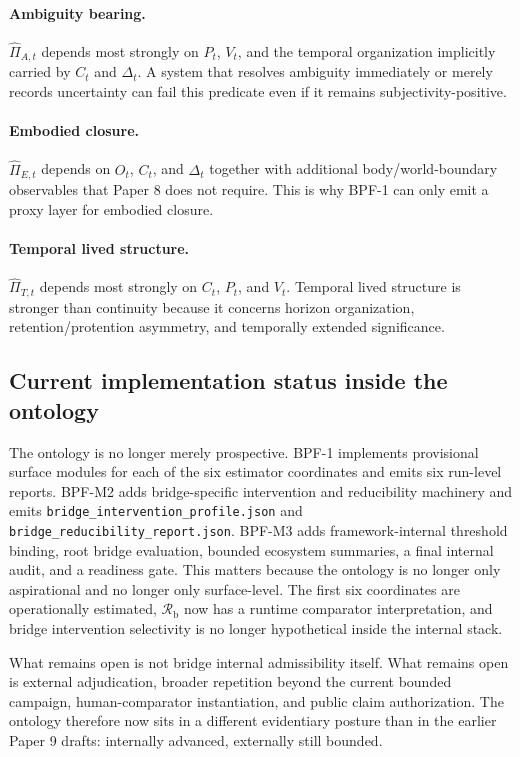 \documentclass[11pt,a4paper]{article}
\theoremstyle{definition}
\newcommand{\OwnField}{O}
\newcommand{\ContField}{C}
\newcommand{\Persp}{P}
\newcommand{\ValAsym}{V}
\newcommand{\IntervProf}{\Delta}
\newcommand{\BridgeMargin}{\mathcal{R}_{\mathrm{b}}}
\begin{document}
\paragraph{Ambiguity bearing.}
$\widehat{\Pi}_{A,t}$ depends most strongly on $\Persp_t$, $\ValAsym_t$, and the temporal organization implicitly carried by $\ContField_t$ and $\IntervProf_t$. A system that resolves ambiguity immediately or merely records uncertainty can fail this predicate even if it remains subjectivity-positive.

\paragraph{Embodied closure.}
$\widehat{\Pi}_{E,t}$ depends on $\OwnField_t$, $\ContField_t$, and $\IntervProf_t$ together with additional body/world-boundary observables that Paper 8 does not require. This is why BPF-1 can only emit a proxy layer for embodied closure.

\paragraph{Temporal lived structure.}
$\widehat{\Pi}_{T,t}$ depends most strongly on $\ContField_t$, $\Persp_t$, and $\ValAsym_t$. Temporal lived structure is stronger than continuity because it concerns horizon organization, retention/protention asymmetry, and temporally extended significance.

\subsection{Current implementation status inside the ontology}
The ontology is no longer merely prospective. BPF-1 implements provisional surface modules for each of the six estimator coordinates and emits six run-level reports. BPF-M2 adds bridge-specific intervention and reducibility machinery and emits \texttt{bridge\_intervention\_profile.json} and \texttt{bridge\_reducibility\_report.json}. BPF-M3 adds framework-internal threshold binding, root bridge evaluation, bounded ecosystem summaries, a final internal audit, and a readiness gate. This matters because the ontology is no longer only aspirational and no longer only surface-level. The first six coordinates are operationally estimated, $\BridgeMargin$ now has a runtime comparator interpretation, and bridge intervention selectivity is no longer hypothetical inside the internal stack.

What remains open is not bridge internal admissibility itself. What remains open is external adjudication, broader repetition beyond the current bounded campaign, human-comparator instantiation, and public claim authorization. The ontology therefore now sits in a different evidentiary posture than in the earlier Paper 9 drafts: internally advanced, externally still bounded.
\end{document}
